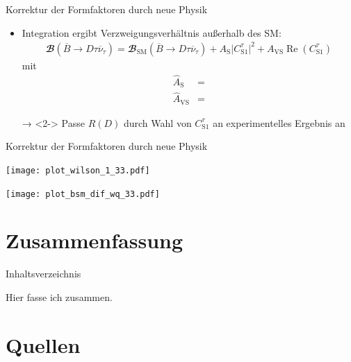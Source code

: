 \documentclass[fleqn, aspectratio=1610, professionalfonts, 9pt]{beamer}
\begin{document}
\begin{frame}{Korrektur der Formfaktoren durch neue Physik}
  \begin{itemize}
    \setlength\itemsep{1em}
    \item<1-> Integration ergibt Verzweigungsverhältnis außerhalb des SM:
    \begin{align*}
        {\mathbfcal{B}}\!\left(\overline{B} \to D \tau \overline{\nu}_\tau \right) = {\mathbfcal{B}}_\text{SM}\!\left(\overline{B} \to D \tau \overline{\nu}_\tau \right) + A_\text{S} \lvert C_{\text{S}1}^{\tau} \rvert^2 + A_{\text{VS}} \operatorname{Re}(C_{\text{S}1}^{\tau})
    \end{align*}
    mit
    \begin{align*}
      \hat{A}_\text{S} &=  \\
      \hat{A}_{\text{VS}} &= 
    \end{align*}
    \item[→]<2-> Passe $R(D)$ durch Wahl von $C_{\text{S}1}^\tau$ an experimentelles Ergebnis an
  \end{itemize}
\end{frame}


\begin{frame}{Korrektur der Formfaktoren durch neue Physik}
  \begin{minipage}{7.4cm}
      \texttt{[image: plot\_wilson\_1\_33.pdf]}
  \end{minipage}
  \begin{minipage}{7.4cm}
      \texttt{[image: plot\_bsm\_dif\_wq\_33.pdf]}
  \end{minipage}%
\end{frame}


\section{Zusammenfassung}

\begin{frame}{Inhaltsverzeichnis}
  \tableofcontents[currentsection,currentsubsection,
      hideothersubsections,
      sectionstyle=show/shaded,
  ]\end{frame}

\begin{frame}
    Hier fasse ich zusammen.
\end{frame}

\section{Quellen}
\end{document}
